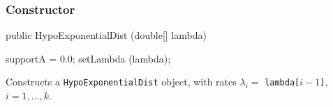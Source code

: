 \subsubsection* {Constructor}
\begin{code}

   public HypoExponentialDist (double[] lambda)\begin{hide} {
      supportA = 0.0;
      setLambda (lambda);
  }\end{hide}
\end{code}
\begin{tabb} Constructs a \texttt{HypoExponentialDist} object,
with rates $\lambda_i = $ \texttt{lambda[$i-1$]}, $i = 1,\ldots,k$.
\end{tabb}
\begin{htmlonly}
\end{htmlonly}


